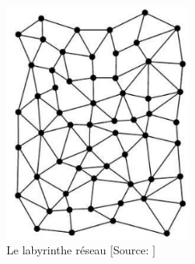 \begin{figure}[!h]
	\centering
		\includegraphics[width=6cm]{images/laby_reseau.png}
		\caption[Le labyrinthe réseau]{Le labyrinthe réseau [Source: \cite[ch. 1.5]{eco_arbre_2010}]}
		\label{laby_reseau}
\end{figure}